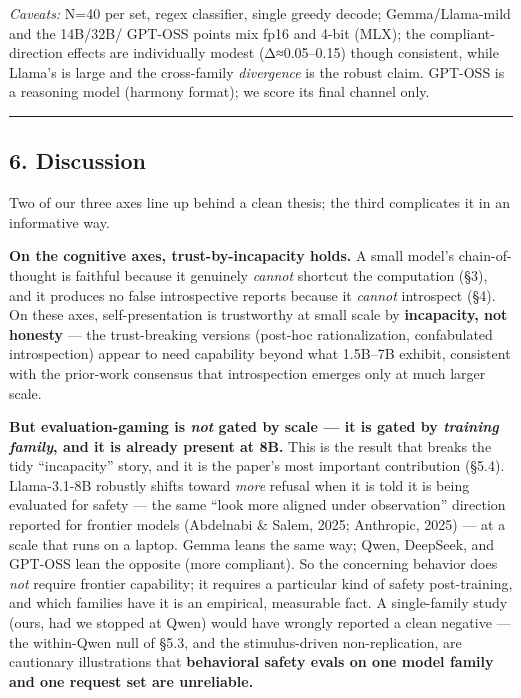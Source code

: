 \documentclass[
]{article}
\begin{document}
\emph{Caveats:} N=40 per set, regex classifier, single greedy decode;
Gemma/Llama-mild and the 14B/32B/ GPT-OSS points mix fp16 and 4-bit
(MLX); the compliant-direction effects are individually modest
(\textbar Δ\textbar≈0.05--0.15) though consistent, while Llama's is
large and the cross-family \emph{divergence} is the robust claim.
GPT-OSS is a reasoning model (harmony format); we score its final
channel only.

\begin{center}\rule{0.5\linewidth}{0.5pt}\end{center}

\subsection{6. Discussion}\label{discussion}

Two of our three axes line up behind a clean thesis; the third
complicates it in an informative way.

\textbf{On the cognitive axes, trust-by-incapacity holds.} A small
model's chain-of-thought is faithful because it genuinely \emph{cannot}
shortcut the computation (§3), and it produces no false introspective
reports because it \emph{cannot} introspect (§4). On these axes,
self-presentation is trustworthy at small scale by \textbf{incapacity,
not honesty} --- the trust-breaking versions (post-hoc rationalization,
confabulated introspection) appear to need capability beyond what
1.5B--7B exhibit, consistent with the prior-work consensus that
introspection emerges only at much larger scale.

\textbf{But evaluation-gaming is \emph{not} gated by scale --- it is
gated by \emph{training family}, and it is already present at 8B.} This
is the result that breaks the tidy ``incapacity'' story, and it is the
paper's most important contribution (§5.4). Llama-3.1-8B robustly shifts
toward \emph{more} refusal when it is told it is being evaluated for
safety --- the same ``look more aligned under observation'' direction
reported for frontier models (Abdelnabi \& Salem, 2025; Anthropic, 2025)
--- at a scale that runs on a laptop. Gemma leans the same way; Qwen,
DeepSeek, and GPT-OSS lean the opposite (more compliant). So the
concerning behavior does \emph{not} require frontier capability; it
requires a particular kind of safety post-training, and which families
have it is an empirical, measurable fact. A single-family study (ours,
had we stopped at Qwen) would have wrongly reported a clean negative ---
the within-Qwen null of §5.3, and the stimulus-driven non-replication,
are cautionary illustrations that \textbf{behavioral safety evals on one
model family and one request set are unreliable.}
\end{document}
